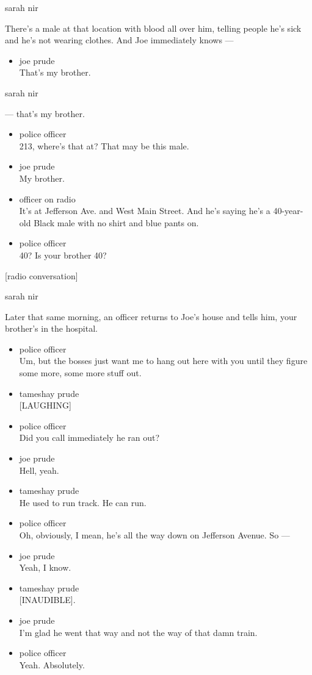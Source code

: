 sarah nir

There's a male at that location with blood all over him, telling people
he's sick and he's not wearing clothes. And Joe immediately knows ---

\begin{itemize}
\tightlist
\item
  joe prude\\
  That's my brother.
\end{itemize}

sarah nir

--- that's my brother.

\begin{itemize}
\item
  police officer\\
  213, where's that at? That may be this male.
\item
  joe prude\\
  My brother.
\item
  officer on radio\\
  It's at Jefferson Ave. and West Main Street. And he's saying he's a
  40-year-old Black male with no shirt and blue pants on.
\item
  police officer\\
  40? Is your brother 40?
\end{itemize}

{[}radio conversation{]}

sarah nir

Later that same morning, an officer returns to Joe's house and tells
him, your brother's in the hospital.

\begin{itemize}
\item
  police officer\\
  Um, but the bosses just want me to hang out here with you until they
  figure some more, some more stuff out.
\item
  tameshay prude\\
  {[}LAUGHING{]}
\item
  police officer\\
  Did you call immediately he ran out?
\item
  joe prude\\
  Hell, yeah.
\item
  tameshay prude\\
  He used to run track. He can run.
\item
  police officer\\
  Oh, obviously, I mean, he's all the way down on Jefferson Avenue. So
  ---
\item
  joe prude\\
  Yeah, I know.
\item
  tameshay prude\\
  {[}INAUDIBLE{]}.
\item
  joe prude\\
  I'm glad he went that way and not the way of that damn train.
\item
  police officer\\
  Yeah. Absolutely.
\end{itemize}

